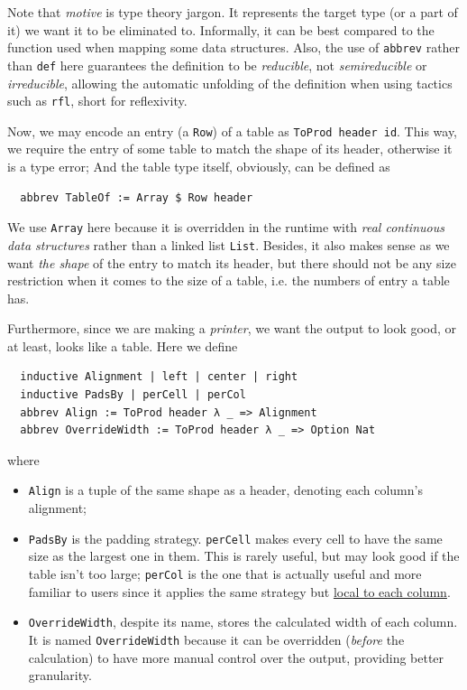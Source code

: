 \documentclass[a4paper, 11pt]{article}
\theoremstyle{remark}\newtheorem*{remark}{Remark}
\theoremstyle{definition}\newtheorem*{definition}{Definition}
\begin{document}
Note that \emph{motive} is type theory jargon.
It represents the target type (or a part of it) we want it to be eliminated to. Informally,
it can be best compared to the function used when mapping some data structures. Also, the
use of \texttt{abbrev} rather than \texttt{def} here guarantees the
definition to be \emph{reducible}, not \emph{semireducible} or \emph{irreducible}, allowing
the automatic unfolding of the definition when using tactics such as \texttt{rfl}, short for
reflexivity.

Now, we may encode an entry (a \texttt{Row}) of a table as \texttt{ToProd header id}. This way,
we require the entry of some table to match the shape of its header, otherwise it is
a type error; And the table type itself, obviously, can be defined as
\begin{verbatim}
  abbrev TableOf := Array $ Row header
\end{verbatim}

We use \texttt{Array} here because it is overridden in the runtime with \emph{real continuous
data structures} rather than a linked list \texttt{List}. Besides, it also makes sense as we want
\emph{the shape} of the entry to match its header, but there should not be any size restriction
when it comes to the size of a table, i.e. the numbers of entry a table has.

Furthermore, since we are making a \emph{printer}, we want the output to look good, or at least,
looks like a table. Here we define
\begin{verbatim}
  inductive Alignment | left | center | right
  inductive PadsBy | perCell | perCol
  abbrev Align := ToProd header λ _ => Alignment
  abbrev OverrideWidth := ToProd header λ _ => Option Nat
\end{verbatim}

where
\begin{itemize}\itemsep0em
\item \texttt{Align} is a tuple of the same shape as a header, denoting each column's alignment;
\item \texttt{PadsBy} is the padding strategy. \texttt{perCell} makes every cell
to have the same size as the largest one in them. This is rarely useful, but may look good
if the table isn't too large; \texttt{perCol} is the one that is actually useful and more familiar to users since it applies the same strategy but \underline{local to each column}.
\item \texttt{OverrideWidth}, despite its name, stores the calculated width of each column.
It is named \texttt{OverrideWidth} because it can be
overridden (\emph{before} the calculation) to have more manual
control over the output, providing better granularity.
\end{itemize}
\end{document}
